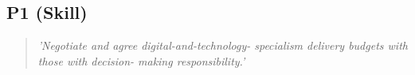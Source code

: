 \subsection{P1 (Skill)}

  \begin{quote}
    \textit{'Negotiate and agree digital-and-technology-
    specialism delivery budgets with those with decision-
    making responsibility.'}
  \end{quote}

\newpage